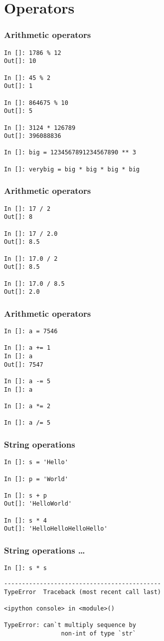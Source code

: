 \documentclass[14pt,compress]{beamer}
\begin{document}
\section{Operators}
\begin{frame}[fragile]
  \frametitle{Arithmetic operators}
  \small
  \begin{lstlisting}
In []: 1786 % 12
Out[]: 10

In []: 45 % 2
Out[]: 1

In []: 864675 % 10
Out[]: 5

In []: 3124 * 126789
Out[]: 396088836

In []: big = 1234567891234567890 ** 3

In []: verybig = big * big * big * big
  \end{lstlisting}
\end{frame}

\begin{frame}[fragile]
  \frametitle{Arithmetic operators}
  \begin{lstlisting}
In []: 17 / 2
Out[]: 8

In []: 17 / 2.0
Out[]: 8.5

In []: 17.0 / 2
Out[]: 8.5

In []: 17.0 / 8.5
Out[]: 2.0
  \end{lstlisting}
\end{frame}

\begin{frame}[fragile]
  \frametitle{Arithmetic operators}
  \begin{lstlisting}
In []: a = 7546

In []: a += 1
In []: a
Out[]: 7547

In []: a -= 5
In []: a

In []: a *= 2

In []: a /= 5
  \end{lstlisting}
\end{frame}

\begin{frame}[fragile]
  \frametitle{String operations}
  \begin{lstlisting}
In []: s = 'Hello'

In []: p = 'World'

In []: s + p 
Out[]: 'HelloWorld'

In []: s * 4
Out[]: 'HelloHelloHelloHello'
  \end{lstlisting}
\end{frame}

\begin{frame}[fragile]
  \frametitle{String operations \ldots}
  \begin{lstlisting}
In []: s * s
  \end{lstlisting}
  \pause
  \begin{lstlisting}
--------------------------------------------
TypeError  Traceback (most recent call last)

<ipython console> in <module>()

TypeError: can`t multiply sequence by
                non-int of type `str`
  \end{lstlisting}
\end{frame}
\end{document}
